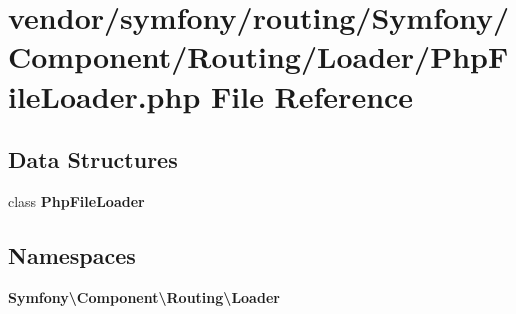 \section{vendor/symfony/routing/\+Symfony/\+Component/\+Routing/\+Loader/\+Php\+File\+Loader.php File Reference}
\label{routing_2_symfony_2_component_2_routing_2_loader_2_php_file_loader_8php}
\subsection*{Data Structures}
\begin{DoxyCompactItemize}
\item 
class {\bf Php\+File\+Loader}
\end{DoxyCompactItemize}
\subsection*{Namespaces}
\begin{DoxyCompactItemize}
\item 
 {\bf Symfony\textbackslash{}\+Component\textbackslash{}\+Routing\textbackslash{}\+Loader}
\end{DoxyCompactItemize}
